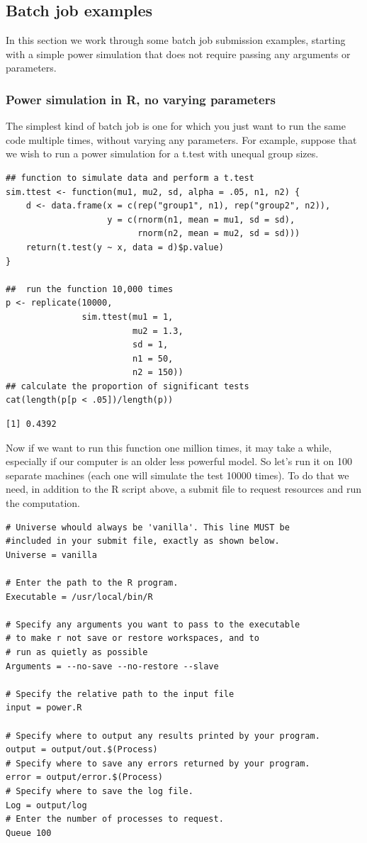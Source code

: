 \documentclass[11pt]{article}
\begin{document}
\subsection{Batch job examples}
\label{sec-7-3}
In this section we work through some batch job submission examples, starting with a simple power simulation that does not require passing any arguments or parameters.

\subsubsection{Power simulation in R, no varying parameters}
\label{sec-7-3-1}
The simplest kind of batch job is one for which you just want to run the same code multiple times, without varying any parameters. For example, suppose that we wish to run a power simulation for a t.test with unequal group sizes. 
\begin{verbatim}
## function to simulate data and perform a t.test
sim.ttest <- function(mu1, mu2, sd, alpha = .05, n1, n2) {
    d <- data.frame(x = c(rep("group1", n1), rep("group2", n2)),
                    y = c(rnorm(n1, mean = mu1, sd = sd),
                          rnorm(n2, mean = mu2, sd = sd)))
    return(t.test(y ~ x, data = d)$p.value)
}

##  run the function 10,000 times 
p <- replicate(10000,
               sim.ttest(mu1 = 1,
                         mu2 = 1.3,
                         sd = 1,
                         n1 = 50,
                         n2 = 150))
## calculate the proportion of significant tests
cat(length(p[p < .05])/length(p))
\end{verbatim}

\begin{verbatim}
[1] 0.4392
\end{verbatim}

Now if we want to run this function one million times, it may take a while, especially if our computer is an older less powerful model. So let's run it on 100 separate machines (each one will simulate the test 10000 times). To do that we need, in addition to the R script above, a submit file to request resources and run the computation. 
\begin{verbatim}
# Universe whould always be 'vanilla'. This line MUST be 
#included in your submit file, exactly as shown below.
Universe = vanilla

# Enter the path to the R program.
Executable = /usr/local/bin/R

# Specify any arguments you want to pass to the executable
# to make r not save or restore workspaces, and to 
# run as quietly as possible
Arguments = --no-save --no-restore --slave

# Specify the relative path to the input file
input = power.R

# Specify where to output any results printed by your program.
output = output/out.$(Process)
# Specify where to save any errors returned by your program.
error = output/error.$(Process)
# Specify where to save the log file.
Log = output/log
# Enter the number of processes to request.
Queue 100
\end{verbatim}
\end{document}
